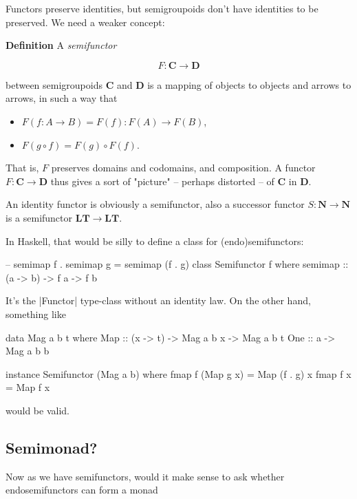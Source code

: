 \documentclass{article}
\begin{document}
Functors preserve identities, but semigroupoids don't have identities to be preserved.
We need a weaker concept:

\begin{definition}\textbf{Definition}
A \emph{semifunctor}

\begin{equation*}
F : \mathbf{C} \to \mathbf{D}
\end{equation*}

between semigroupoids $\mathbf{C}$ and $\mathbf{D}$ is a mapping of objects
to objects and arrows to arrows, in such a way that
\begin{itemize}
\item $F (f : A \to B) = F(f) : F(A) \to F(B)$,
\item $F(g \circ f) = F(g) \circ F(f)$.
\end{itemize}
That is, $F$ preserves domains and codomains,
and composition. A functor $F : \mathbf{C} \to \mathbf{D}$ thus gives
a sort of "picture" -- perhaps distorted -- of $\mathbf{C}$ in $\mathbf{D}$.
\end{definition}

An identity functor is obviously a semifunctor, also a successor functor $S : \mathbf{N} \to \mathbf{N}$
is a semifunctor $\mathbf{LT} \to \mathbf{LT}$.

In Haskell, that would be silly to define a class for (endo)semifunctors:

\begin{code}
-- semimap f . semimap g = semimap (f . g)
class Semifunctor f where
    semimap :: (a -> b) -> f a -> f b
\end{code}

It's the |Functor| type-class without an identity law.
On the other hand, something like

\begin{code}
data Mag a b t where
    Map   :: (x -> t) -> Mag a b x -> Mag a b t
    One   :: a -> Mag a b b

instance Semifunctor (Mag a b) where
    fmap f (Map g x) = Map (f . g) x
    fmap f x         = Map f x
\end{code}

would be valid.

\subsection{Semimonad?}

Now as we have semifunctors, would it make sense to ask whether
endosemifunctors can form a monad
\end{document}

